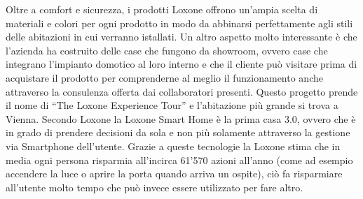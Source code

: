 Oltre a comfort e sicurezza, i prodotti Loxone offrono un’ampia scelta di materiali e colori per ogni prodotto in modo da abbinarsi perfettamente agli stili delle abitazioni in cui verranno istallati. Un altro aspetto molto interessante è che l’azienda ha costruito delle case che fungono da showroom, ovvero case che integrano l’impianto domotico al loro interno e che il cliente può visitare prima di acquistare il prodotto per comprenderne al meglio il funzionamento anche attraverso la consulenza offerta dai collaboratori presenti. Questo progetto prende il nome di “The Loxone Experience Tour” e l’abitazione più grande si trova a Vienna. Secondo Loxone la Loxone Smart Home è la prima casa 3.0, ovvero che è in grado di prendere decisioni da sola e non più solamente attraverso la gestione via Smartphone dell’utente. Grazie a queste tecnologie la Loxone stima che in media ogni persona risparmia all’incirca 61'570 azioni all’anno (come ad esempio accendere la luce o aprire la porta quando arriva un ospite), ciò fa risparmiare all’utente molto tempo che può invece essere utilizzato per fare altro.